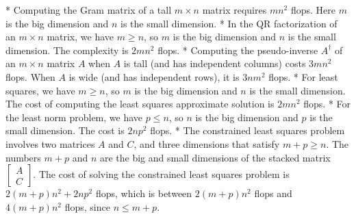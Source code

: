 * Computing the Gram matrix of a tall \(m\times n\) matrix requires \(mn^{2}\) flops. Here \(m\) is the big dimension and \(n\) is the small dimension.
* In the QR factorization of an \(m\times n\) matrix, we have \(m\geq n\), so \(m\) is the big dimension and \(n\) is the small dimension. The complexity is \(2mn^{2}\) flops.
* Computing the pseudo-inverse \(A^{\dagger}\) of an \(m\times n\) matrix \(A\) when \(A\) is tall (and has independent columns) costs \(3mn^{2}\) flops. When \(A\) is wide (and has independent rows), it is \(3nm^{2}\) flops.
* For least squares, we have \(m\geq n\), so \(m\) is the big dimension and \(n\) is the small dimension. The cost of computing the least squares approximate solution is \(2mn^{2}\) flops.
* For the least norm problem, we have \(p\leq n\), so \(n\) is the big dimension and \(p\) is the small dimension. The cost is \(2np^{2}\) flops.
* The constrained least squares problem involves two matrices \(A\) and \(C\), and three dimensions that satisfy \(m+p\geq n\). The numbers \(m+p\) and \(n\) are the big and small dimensions of the stacked matrix \(\left[\begin{array}{c}A\\ C\end{array}\right]\). The cost of solving the constrained least squares problem is \(2(m+p)n^{2}+2np^{2}\) flops, which is between \(2(m+p)n^{2}\) flops and \(4(m+p)n^{2}\) flops, since \(n\leq m+p\).

